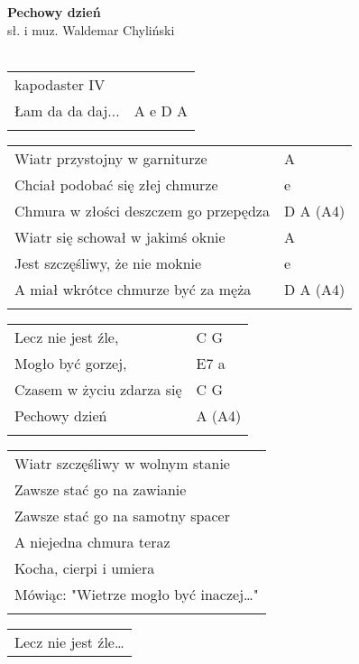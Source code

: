 \documentclass[a5paper]{article}
\begin{document}


\noindent
\fontsize{12pt}{15pt}\selectfont
\textbf{Pechowy dzień} \\
\fontsize{8pt}{10pt}\selectfont
sł. i muz. Waldemar Chyliński \\ \\
\fontsize{10pt}{12pt}\selectfont
{}
\begin{tabular}{@{}p{8.00cm}p{3cm}@{}}
\noindent
kapodaster IV \\
Łam da da daj... & A e D A \\ \\
\end{tabular}

\fontsize{10pt}{12pt}\selectfont
{}
\begin{tabular}{@{}p{8.00cm}p{3cm}@{}}
\noindent
Wiatr przystojny w garniturze & A \\
Chciał podobać się złej chmurze & e \\
Chmura w złości deszczem go przepędza & D A (A4) \\
Wiatr się schował w jakimś oknie & A  \\
Jest szczęśliwy, że nie moknie & e \\
A miał wkrótce chmurze być za męża & D A (A4) \\ \\
\end{tabular}

\noindent
\begin{tabular}{@{}p{7.00cm}p{3cm}@{}}
Lecz nie jest źle, & C G \\
Mogło być gorzej, & E7 a \\
Czasem w życiu zdarza się & C G \\
Pechowy dzień & A (A4) \\ \\
\end{tabular}

\noindent
\begin{tabular}{@{}p{8.00cm}@{}}
Wiatr szczęśliwy w wolnym stanie \\
Zawsze stać go na zawianie \\
Zawsze stać go na samotny spacer \\
A niejedna chmura teraz \\
Kocha, cierpi i umiera \\
Mówiąc: "Wietrze mogło być inaczej…" \\ \\
\end{tabular}

\noindent
\begin{tabular}{@{}p{7.00cm}@{}}
Lecz nie jest źle…
\end{tabular}
\end{document}
